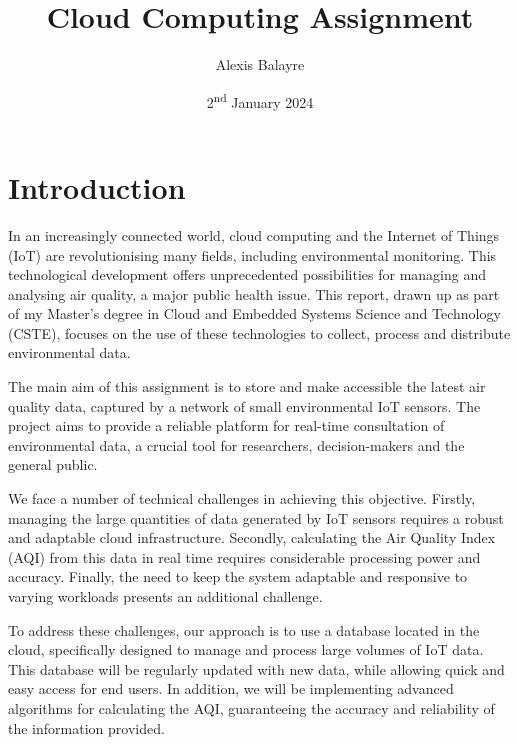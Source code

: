 \documentclass[12pt,oneside]{book} %
\title{Cloud Computing Assignment}
\author{Alexis Balayre}
\date{2\textsuperscript{nd} January 2024}
\begin{document}
\frontmatter

\maketitle

{
    \clearpage
    \singlespacing
    {
        \tableofcontents
    }
    \clearpage

    \listoffigures

    \listoftables
}

\mainmatter
\pagestyle{fancy}
\fancyhead[L]{\nouppercase{\leftmark}}
\fancyhead[R]{\nouppercase{\rightmark}}

\chapter{Introduction}
In an increasingly connected world, cloud computing and the Internet of Things
(IoT) are revolutionising many fields, including environmental monitoring. This
technological development offers unprecedented possibilities for managing and
analysing air quality, a major public health issue. This report, drawn up as
part of my Master's degree in Cloud and Embedded Systems Science and Technology
(CSTE), focuses on the use of these technologies to collect, process and
distribute environmental data.

The main aim of this assignment is to store and make accessible the latest air
quality data, captured by a network of small environmental IoT sensors. The
project aims to provide a reliable platform for real-time consultation of
environmental data, a crucial tool for researchers, decision-makers and the
general public.

We face a number of technical challenges in achieving this objective. Firstly,
managing the large quantities of data generated by IoT sensors requires a
robust and adaptable cloud infrastructure. Secondly, calculating the Air
Quality Index (AQI) from this data in real time requires considerable
processing power and accuracy. Finally, the need to keep the system adaptable
and responsive to varying workloads presents an additional challenge.

To address these challenges, our approach is to use a database located in the
cloud, specifically designed to manage and process large volumes of IoT data.
This database will be regularly updated with new data, while allowing quick and
easy access for end users. In addition, we will be implementing advanced
algorithms for calculating the AQI, guaranteeing the accuracy and reliability
of the information provided.
\end{document}
